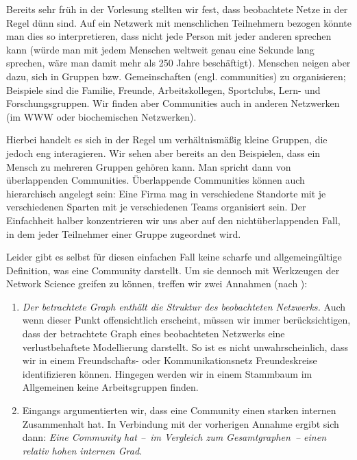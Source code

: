 Bereits sehr früh in der Vorlesung stellten wir fest, dass beobachtete Netze in der Regel dünn sind.
Auf ein Netzwerk mit menschlichen Teilnehmern bezogen könnte man dies so interpretieren, dass nicht jede Person mit jeder anderen sprechen kann (würde man mit jedem Menschen weltweit genau eine Sekunde lang sprechen, wäre man damit mehr als 250 Jahre beschäftigt).
Menschen neigen aber dazu, sich in Gruppen bzw. Gemeinschaften (engl. communities) zu organisieren;
Beispiele sind die Familie, Freunde, Arbeitskollegen, Sportclubs, Lern- und Forschungsgruppen.
Wir finden aber Communities auch in anderen Netzwerken (\zB im WWW oder biochemischen Netzwerken).

Hierbei handelt es sich in der Regel um verhältnismäßig kleine Gruppen, die jedoch eng interagieren.
Wir sehen aber bereits an den Beispielen, dass ein Mensch zu mehreren Gruppen gehören kann.
Man spricht dann von überlappenden Communities.
Überlappende Communities können auch hierarchisch angelegt sein: Eine Firma mag in verschiedene Standorte mit je verschiedenen Sparten mit je verschiedenen Teams organisiert sein.
Der Einfachheit halber konzentrieren wir uns aber auf den nichtüberlappenden Fall, in dem jeder Teilnehmer einer Gruppe zugeordnet wird.

Leider gibt es selbst für diesen einfachen Fall keine scharfe und allgemeingültige Definition, was eine Community darstellt.
Um sie dennoch mit Werkzeugen der Network Science greifen zu können, treffen wir zwei Annahmen (nach \cite{barabasi2014network}):

\begin{enumerate}[label=H\arabic*), ref=H\arabic*]
    \item\label{enum:contains_structure}
          \emph{Der betrachtete Graph enthält die Struktur des beobachteten Netzwerks.}
          Auch wenn dieser Punkt offensichtlich erscheint, müssen wir immer berücksichtigen, dass der betrachtete Graph eines beobachteten Netzwerks eine verlustbehaftete Modellierung darstellt.
          So ist es nicht unwahrscheinlich, dass wir in einem Freundschafts- oder Kommunikationsnetz Freundeskreise identifizieren können.
          Hingegen werden wir in einem Stammbaum im Allgemeinen keine Arbeitsgruppen finden.

    \item\label{enum:high_internal_degree}
          Eingangs argumentierten wir, dass eine Community einen starken internen Zusammenhalt hat.
          In Verbindung mit der vorherigen Annahme ergibt sich dann:
          \emph{Eine Community hat --~im Vergleich zum Gesamtgraphen~-- einen relativ hohen internen Grad.}
\end{enumerate}

